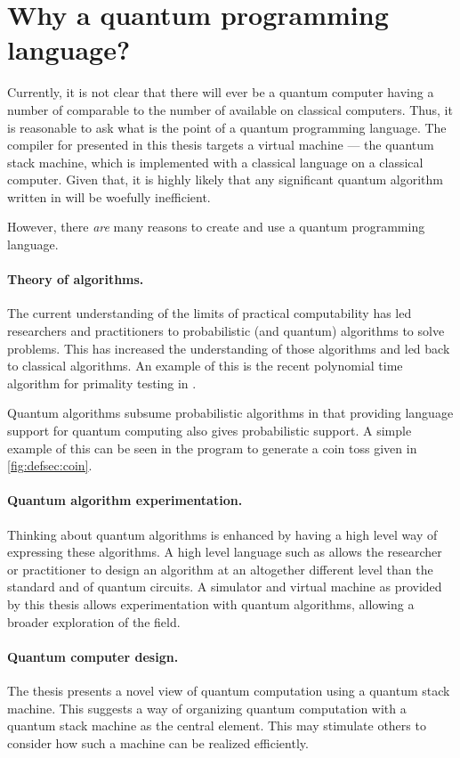 \section{Why a quantum programming language?}\label{sec:why}
Currently, it is not  clear that there will ever be a quantum computer
having a number of \qbits{} comparable to the number of \bits{} available 
on classical computers. Thus, it is reasonable to ask what is the
point of a quantum programming language.
 The compiler for \lqpl{} presented in this thesis
targets a virtual machine --- the quantum stack machine, which
is implemented with a classical language on a classical computer. Given
that, it is highly likely that any significant quantum algorithm written in 
\lqpl{} will be woefully inefficient.


However, there \emph{are} many reasons to create and use a quantum programming
language.

\paragraph{Theory of algorithms.} The current understanding of the 
limits of practical computability has led researchers and practitioners
to probabilistic (and quantum) algorithms to solve problems. This has 
increased the understanding of those algorithms and led back to
classical algorithms. An example of this is the recent 
polynomial time algorithm for primality testing in \cite{agrawal04:primes}.

Quantum algorithms subsume probabilistic algorithms in that
providing language support for quantum computing also gives probabilistic 
support. A simple example of this can be seen in the program to 
generate a coin toss given in \vref{fig:defsec:coin}.

\paragraph{Quantum algorithm experimentation.}
Thinking about quantum algorithms is enhanced by having 
a high level way  of expressing these algorithms.
 A high level language such as \lqpl{}
allows the researcher or practitioner to design an algorithm at an altogether 
different level than the standard \bits{} and \qbits{} of quantum circuits.
A simulator and virtual machine as provided by this 
thesis allows experimentation with quantum algorithms, allowing a
broader exploration of the field.

\paragraph{Quantum computer design.}
The thesis presents a novel view of quantum computation using a quantum 
stack machine. This suggests a way of organizing
 quantum computation with a  quantum stack machine as the central 
element. This may stimulate others to consider how such a machine can be 
realized efficiently.